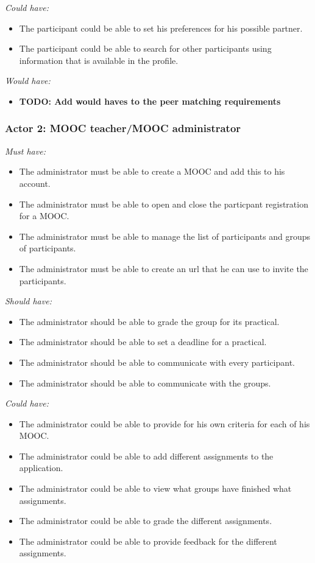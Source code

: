 \documentclass[]{article}
\newcommand{\TODO}[1]{{\color{red}\textbf{TODO: #1}}}
\newcommand{\reqr}[1]{{\noindent\emph{#1:}}}
\begin{document}
\reqr{Could have}
\begin{itemize}
\item The participant could be able to set his preferences for his possible partner.
\item The participant could be able to search for other participants using information that is available in the profile.
\end{itemize}

\reqr{Would have}
\begin{itemize}
\item \TODO{Add would haves to the peer matching requirements}
\end{itemize}


\subsubsection{Actor 2: MOOC teacher/MOOC administrator}

\reqr{Must have}
\begin{itemize}
\item The administrator must be able to create a MOOC and add this to his account.
\item The administrator must be able to open and close the particpant registration for a MOOC.
\item The administrator must be able to manage the list of participants and groups of participants.
\item The administrator must be able to create an url that he can use to invite the participants.
\end{itemize}

\reqr{Should have}
\begin{itemize}
\item The administrator should be able to grade the group for its practical.
\item The administrator should be able to set a deadline for a practical.
\item The administrator should be able to communicate with every participant.
\item The administrator should be able to communicate with the groups.
\end{itemize}

\reqr{Could have}
\begin{itemize}
\item The administrator could be able to provide for his own criteria for each of his MOOC.
\item The administrator could be able to add different assignments to the application.
\item The administrator could be able to view what groups have finished what assignments.
\item The administrator could be able to grade the different assignments.
\item The administrator could be able to provide feedback for the different assignments.
\end{itemize}
\end{document}
